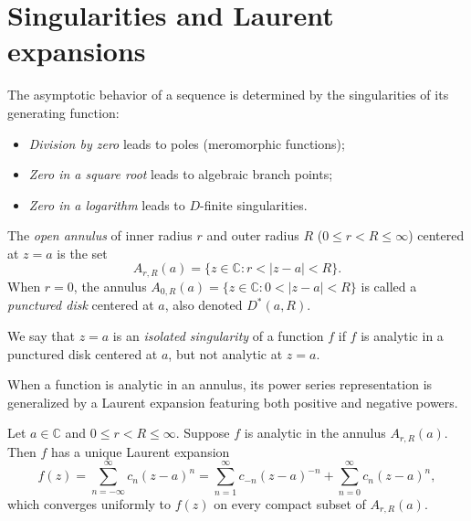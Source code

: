 
\section*{Singularities and Laurent expansions}

The asymptotic behavior of a sequence is determined by the singularities of its generating function:
\begin{itemize}
    \item \emph{Division by zero} leads to poles (meromorphic functions);
    \item \emph{Zero in a square root} leads to algebraic branch points;
    \item \emph{Zero in a logarithm} leads to $D$-finite singularities.
\end{itemize}

\begin{definition}
    The \emph{open annulus} of inner radius \(r\) and outer radius \(R\) (\(0 \le r < R \le \infty\)) centered at \(z = a\) is the set
    \[
        A_{r, R}(a) = \{ z \in \mathbb{C} : r < |z - a| < R \}.
    \]
    When \(r = 0\), the annulus \(A_{0, R}(a) = \{ z \in \mathbb{C} : 0 < |z - a| < R \}\) is called a \emph{punctured disk} centered at \(a\), also denoted \(D^*(a, R)\).
\end{definition}

\begin{definition}
    We say that \(z = a\) is an \emph{isolated singularity} of a function \(f\) if \(f\) is analytic in a punctured disk centered at \(a\), but not analytic at \(z = a\).
\end{definition}

When a function is analytic in an annulus, its power series representation is generalized by a Laurent expansion featuring both positive and negative powers.

\begin{proposition}
    Let \(a \in \mathbb{C}\) and \(0 \le r < R \le \infty\).
    Suppose \(f\) is analytic in the annulus \(A_{r, R}(a)\).
    Then \(f\) has a unique Laurent expansion
    \begin{equation}
        \label{eq:laurent-expansion}
        f(z) = \sum_{n=-\infty}^{\infty} c_n (z - a)^n = \sum_{n=1}^{\infty} c_{-n} (z - a)^{-n} + \sum_{n=0}^{\infty} c_n (z - a)^n,
    \end{equation}
    which converges uniformly to \(f(z)\) on every compact subset of \(A_{r, R}(a)\).
\end{proposition}

